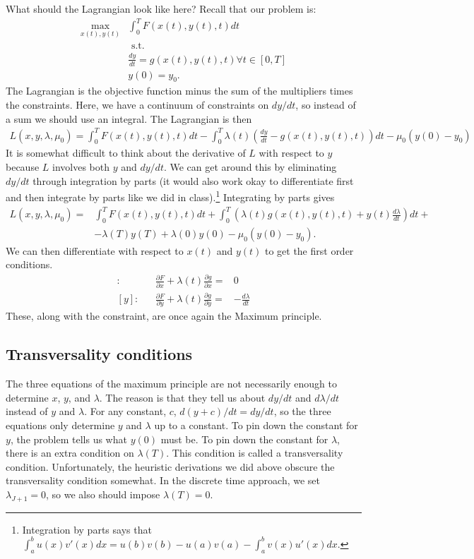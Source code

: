 What should the Lagrangian look like here? Recall that our problem is:
\begin{align*}
  \max_{x(t),y(t)} & \int_0^T F(x(t),y(t),t) dt \\
  & \text{ s.t.} \\
  & \frac{d y}{dt} = g(x(t),y(t),t) \forall t \in [0,T] \\ 
  & y(0) = y_0.
\end{align*}
The Lagrangian is the objective function minus the sum of the
multipliers times the constraints. Here, we have a continuum of
constraints on $dy/dt$, so instead of a sum we should use an
integral. The Lagrangian is then 
\begin{align*}
  L(x,y,\lambda,\mu_0) = \int_0^T F(x(t),y(t),t) dt - \int_0^T
  \lambda(t)\left( \frac{dy}{dt} - g(x(t),y(t),t) \right) dt - \mu_0
  (y(0) - y_0) 
\end{align*}
It is somewhat difficult to think about the derivative of $L$ with
respect to $y$ because $L$ involves both $y$ and $dy/dt$. We can get
around this by eliminating $dy/dt$ through integration by parts (it
would also work okay to differentiate first and then integrate by parts
like we did in class).\footnote{Integration by parts says that
  $\int_a^b u(x) v'(x) dx = u(b)v(b) - u(a)v(a) - \int_a^b v(x) u'(x)
  dx$.} Integrating by parts gives
\begin{align*}
  L(x,y,\lambda,\mu_0) = & \int_0^T F(x(t),y(t),t) dt +\int_0^T  \left(  
    \lambda(t) g(x(t),y(t),t) + y(t) \frac{d\lambda}{dt}\right)dt +
  \\ & -\lambda(T) y(T) + \lambda(0) y(0) - \mu_0
  (y(0) - y_0).
\end{align*} 
We can then differentiate with respect to $x(t)$ and $y(t)$ to get the
first order conditions. 
\begin{align*}
  [x]: && \frac{\partial F}{\partial x} + \lambda(t) \frac{\partial
    g}{\partial x} = &  0 \\
  [y]: && \frac{\partial F}{\partial y} + \lambda(t) \frac{\partial
    g}{\partial y} = &  -\frac{d\lambda}{dt}  
\end{align*}
These, along with the constraint, are once again the Maximum
principle. 

\subsection{Transversality conditions}

The three equations of the maximum principle are not necessarily
enough to determine $x$, $y$, and $\lambda$. The reason is that they
tell us about $dy/dt$ and $d\lambda/dt$ instead of $y$ and
$\lambda$. For any constant, $c$, $d(y+c)/dt = dy/dt$, so the three
equations only determine $y$ and $\lambda$ up to a constant. To pin
down the constant for $y$, the problem tells us what $y(0)$ must
be. To pin down the constant for $\lambda$, there is an extra
condition on $\lambda(T)$. This condition is called a transversality
condition. Unfortunately, the heuristic derivations we did above
obscure the transversality condition somewhat. In the discrete time
approach, we set $\lambda_{J+1} =0$, so we also should impose
$\lambda(T) = 0$. 

